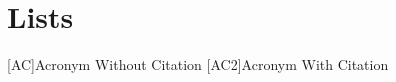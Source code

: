 \appendix
\renewcommand{\appendixtocname}{Appendix}
\renewcommand{\appendixpagename}{\appendixtocname}
\addappheadtotoc
{}
\appendixpage

\chapter{Lists}
\begin{acronym}[\hspace{3cm}]
  [AC]{Acronym Without Citation}
  [AC2]{Acronym With Citation \cite{citeKey2}}
\end{acronym}

\clearpage
\listoffigures
{}


